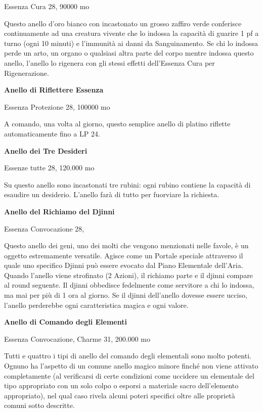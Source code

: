 \documentclass[a4paper,11pt,twoside,openany]{book}
\begin{document}
Essenza Cura 28, 90000 mo

Questo anello d'oro bianco con incastonato un grosso zaffiro verde conferisce continuamente ad una creatura vivente che lo indossa la capacità di guarire 1 pf a turno (ogni 10 minuti) e l'immunità ai danni da Sanguinamento. Se chi lo indossa perde un arto, un organo o qualsiasi altra parte del corpo mentre indossa questo anello, l'anello lo rigenera con gli stessi effetti dell'Essenza Cura per Rigenerazione.

\textbf{Anello di Riflettere Essenza}

Essenza Protezione 28, 100000 mo

A comando, una volta al giorno, questo semplice anello di platino riflette automaticamente fino a LP 24.

\textbf{Anello dei Tre Desideri}

Essenze tutte 28, 120.000 mo

Su questo anello sono incastonati tre rubini: ogni rubino contiene la capacità di esaudire un desiderio. L'anello farà di tutto per fuorviare la richiesta.

\textbf{Anello del Richiamo del Djinni}

Essenza Convocazione 28,

Questo anello dei geni, uno dei molti che vengono menzionati nelle favole, è un oggetto estremamente versatile. Agisce come un Portale speciale attraverso il quale uno specifico Djinni può essere evocato dal Piano Elementale dell'Aria. Quando l'anello viene strofinato (2 Azioni), il richiamo parte e il djinni compare al round seguente. Il djinni obbedisce fedelmente come servitore a chi lo indossa, ma mai per più di 1 ora al giorno. Se il djinni dell'anello dovesse essere ucciso, l'anello perderebbe ogni caratteristica magica e ogni valore.

\textbf{Anello di Comando degli Elementi}

Essenza Convocazione, Charme 31, 200.000 mo

Tutti e quattro i tipi di anello del comando degli elementali sono molto potenti. Ognuno ha l'aspetto di un comune anello magico minore finché non viene attivato completamente (al verificarsi di certe condizioni come uccidere un elementale del tipo appropriato con un solo colpo o esporsi a materiale sacro dell'elemento appropriato), nel qual caso rivela alcuni poteri specifici oltre alle proprietà comuni sotto descritte.
\end{document}
